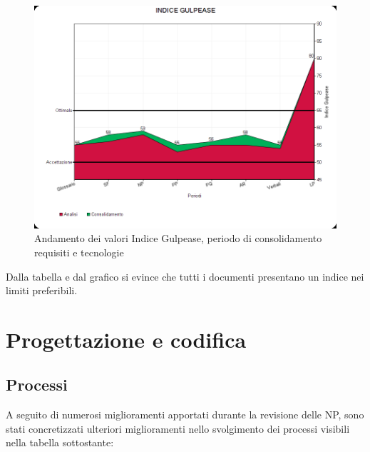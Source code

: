 \documentclass[openany,12pt,a4paper]{report}
\begin{document}
\begin{itemize}
	\begin{figure}[H]
		\includegraphics[scale=0.5]{Gulpease/gulpease-consolidamento}
		\centering
		\caption{Andamento dei valori Indice Gulpease, periodo di consolidamento requisiti e tecnologie}
	\end{figure}
	
	Dalla tabella e dal grafico si evince che tutti i documenti presentano un indice nei limiti preferibili.	
\end{itemize}


\section{Progettazione e codifica}

\subsection{Processi}

A seguito di numerosi miglioramenti apportati durante la revisione delle NP, sono stati concretizzati ulteriori miglioramenti nello svolgimento dei processi visibili nella tabella sottostante:

\newpage
\end{document}
